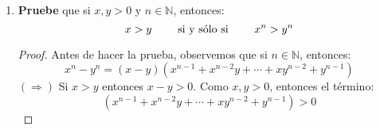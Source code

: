 \documentclass[12pt]{article}
\begin{document}
\begin{enumerate}
\begin{proof}
\begin{equation*}
\begin{split}
                \Rightarrow&\frac{6}{\sqrt{3}+3}\geq\frac{6}{a_k+3}\\
                \Rightarrow&-\frac{6}{a_k+3}\geq-\frac{6}{\sqrt{3}+3}
            \end{split}
        \end{equation*}
        Ahora, veamos que:
        \begin{equation*}
            \begin{split}
                a_{k+1}=&\frac{3(1+a_k)}{3+a_k}\\
                =&\frac{3(3+a_k)}{3+a_k}-\frac{3\cdot2}{3+a_k}\\
                =&3-\frac{6}{3+a_k}\\
                \geq&3-\frac{6}{\sqrt{3}+3}\\
                =&\frac{3\sqrt{3}+9-6}{\sqrt{3}+3}\\
                =&\frac{3\sqrt{3}+3}{\sqrt{3}+3}\cdot\frac{\sqrt{3}-3}{\sqrt{3}-3}\\
                =&\frac{9+3\sqrt{3}-9\sqrt{3}-9}{3-9}\\
                =&\frac{-6\sqrt{3}}{-6}\\
                =&\sqrt{3}\\
                \Rightarrow a_{k+1}\geq \sqrt{3}
            \end{split}
        \end{equation*}
        De esta forma, el resultado se cumple para $n=k+1$. Aplicando inducción, el resultado se cumple para toda $n\in\mathbb{N}$.
        \qed
    \end{proof}
    \item \textbf{Pruebe} que si $x,y>0$ y $n\in\mathbb{N}$, entonces:
    \begin{equation*}
        x>y\qquad\textup{ si y sólo si }\qquad x^n>y^n
    \end{equation*}
    \begin{proof}
        Antes de hacer la prueba, observemos que si $n\in\mathbb{N}$, entonces:
        \begin{equation*}
            x^n-y^n=\left(x-y\right)\left(x^{n-1}+x^{n-2}y+\cdots+xy^{n-2}+y^{n-1}\right)
        \end{equation*}
        $\left(\Rightarrow\right)$ Si $x>y$ entonces $x-y>0$. Como $x,y>0$, entonces el término:
        \begin{equation*}
            \left(x^{n-1}+x^{n-2}y+\cdots+xy^{n-2}+y^{n-1}\right)>0
        \end{equation*}

\end{proof}
\end{enumerate}
\end{document}

